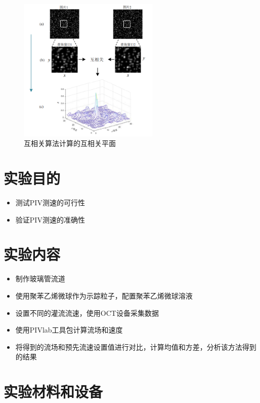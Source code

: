 \documentclass[12pt]{article}
\begin{document}
\begin{figure}[H]
    \centering
    \includegraphics[width=0.6\textwidth]{Images/互相关示意图.png}
    \caption{互相关算法计算的互相关平面}
\end{figure}

\section{实验目的}
\begin{itemize}
    \item 测试PIV测速的可行性
    \item 验证PIV测速的准确性
\end{itemize}

\section{实验内容}
\begin{itemize}
    \item 制作玻璃管流道
    \item 使用聚苯乙烯微球作为示踪粒子，配置聚苯乙烯微球溶液
    \item 设置不同的灌流流速，使用OCT设备采集数据
    \item 使用PIVlab工具包计算流场和速度
    \item 将得到的流场和预先流速设置值进行对比，计算均值和方差，分析该方法得到的结果
\end{itemize}

\section{实验材料和设备}
\end{document}
